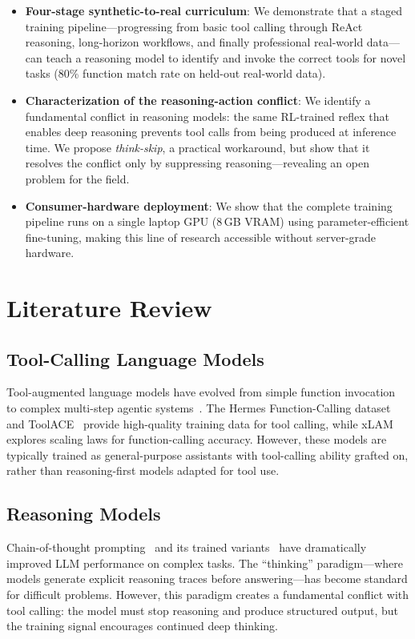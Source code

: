 \documentclass[conference]{IEEEtran}
\begin{document}
\begin{itemize}
\item \textbf{Four-stage synthetic-to-real curriculum}: We demonstrate that a staged training pipeline---progressing from basic tool calling through ReAct reasoning, long-horizon workflows, and finally professional real-world data---can teach a reasoning model to identify and invoke the correct tools for novel tasks (80\% function match rate on held-out real-world data).

\item \textbf{Characterization of the reasoning-action conflict}: We identify a fundamental conflict in reasoning models: the same RL-trained reflex that enables deep reasoning prevents tool calls from being produced at inference time. We propose \textit{think-skip}, a practical workaround, but show that it resolves the conflict only by suppressing reasoning---revealing an open problem for the field.

\item \textbf{Consumer-hardware deployment}: We show that the complete training pipeline runs on a single laptop GPU (8\,GB VRAM) using parameter-efficient fine-tuning, making this line of research accessible without server-grade hardware.
\end{itemize}

\section{Literature Review}
\label{sec:related}

\subsection{Tool-Calling Language Models}
Tool-augmented language models have evolved from simple function invocation~\cite{schick2023toolformer} to complex multi-step agentic systems~\cite{yao2023react, wu2023autogen}. The Hermes Function-Calling dataset~\cite{nousresearch2024hermes} and ToolACE~\cite{liu2024toolace} provide high-quality training data for tool calling, while xLAM~\cite{zhang2024xlam} explores scaling laws for function-calling accuracy. However, these models are typically trained as general-purpose assistants with tool-calling ability grafted on, rather than reasoning-first models adapted for tool use.

\subsection{Reasoning Models}
Chain-of-thought prompting~\cite{wei2022cot} and its trained variants~\cite{guo2025deepseek, yang2024qwen25} have dramatically improved LLM performance on complex tasks. The ``thinking'' paradigm---where models generate explicit reasoning traces before answering---has become standard for difficult problems. However, this paradigm creates a fundamental conflict with tool calling: the model must stop reasoning and produce structured output, but the training signal encourages continued deep thinking.
\end{document}
